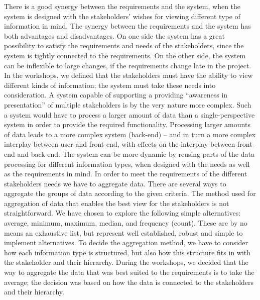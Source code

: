 There is a good synergy between the requirements and the system, when the 
system is designed with the stakeholders' wishes for viewing different type of 
information in mind. The synergy between the requirements and the system has 
both advantages and disadvantages. On one side the system has a great 
possibility to satisfy the requirements and needs of the stakeholders, since 
the system is tightly connected to the requirements. On the other side, the 
system can be inflexible to large changes, if the requirements change late in 
the project. In the workshops, we defined that the stakeholders must have the 
ability to view different kinds of information; the system must take these 
needs into consideration. A system capable of supporting a providing 
“awareness in presentation” of multiple stakeholders is by the very nature 
more complex. Such a system would have to process a larger amount of data than 
a single-perspective system in order to provide the required functionality. 
Processing larger amounts of data leads to a more complex system (back-end) – 
and in turn a more complex interplay between user and front-end, with effects 
on the interplay between front-end and back-end. The system can be more 
dynamic by reusing parts of the data processing for 
different information types, when designed with the needs as well as the 
requirements in mind. In order to meet the requirements of the different 
stakeholders needs we have to aggregate data. There are several ways to 
aggregate the groups of data according to the given criteria. The method used 
for aggregation of data that enables the best view for the stakeholders is not 
straightforward. We have chosen to explore the following simple alternatives: 
average, minimum, maximum, median, and frequency (count). These are by no 
means an exhaustive list, but represent well established, robust and simple to 
implement alternatives. To decide the aggregation method, we have to consider 
how each information type is structured, but also how this structure fits in 
with the stakeholder and their hierarchy. During the workshops, we decided 
that the way to aggregate the data that was best suited to the requirements is 
to take the average; the decision was based on how the data is connected to the stakeholders and their hierarchy.

